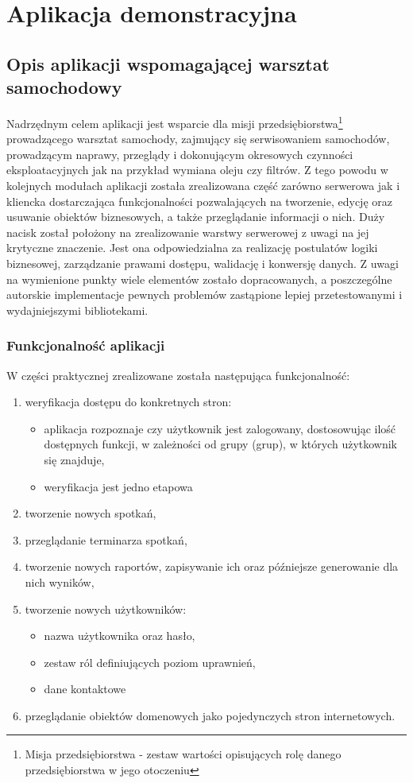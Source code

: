 \chapter{Aplikacja demonstracyjna}
\label{chapter:app}

\section{Opis aplikacji wspomagającej warsztat samochodowy}
	
	Nadrzędnym celem aplikacji jest wsparcie dla misji przedsiębiorstwa\footnote{Misja przedsiębiorstwa - zestaw wartości opisujących rolę danego przedsiębiorstwa w jego otoczeniu} prowadzącego warsztat samochody, zajmujący się serwisowaniem samochodów, prowadzącym naprawy, przeglądy i dokonującym okresowych czynności eksploatacyjnych jak na przykład wymiana oleju czy filtrów. Z tego powodu w kolejnych modułach aplikacji została zrealizowana część zarówno serwerowa jak i kliencka dostarczająca funkcjonalności pozwalających na tworzenie, edycję oraz usuwanie obiektów biznesowych, a także przeglądanie informacji o nich. Duży nacisk został położony na zrealizowanie warstwy serwerowej z uwagi na jej krytyczne znaczenie. Jest ona odpowiedzialna za realizację postulatów logiki biznesowej, zarządzanie prawami dostępu, walidację i konwersję danych. Z uwagi na wymienione punkty wiele elementów zostało dopracowanych, a poszczególne autorskie implementacje pewnych problemów zastąpione lepiej przetestowanymi i wydajniejszymi bibliotekami.
		
	\subsection{Funkcjonalność aplikacji}
	W części praktycznej zrealizowane została następująca funkcjonalność:
	\begin{enumerate}
		\item weryfikacja dostępu do konkretnych stron:
		\begin{itemize}
			\item aplikacja rozpoznaje czy użytkownik jest zalogowany, dostosowując ilość dostępnych funkcji,
			w zależności od grupy (grup), w których użytkownik się znajduje,
			\item weryfikacja jest jedno etapowa
		\end{itemize}
		\item tworzenie nowych spotkań,
		\item przeglądanie terminarza spotkań,
		\item tworzenie nowych raportów, zapisywanie ich oraz późniejsze generowanie dla nich wyników,
		\item tworzenie nowych użytkowników:
		\begin{itemize}
			\item nazwa użytkownika oraz hasło,
			\item zestaw ról definiujących poziom uprawnień,
			\item dane kontaktowe
		\end{itemize}
		\item przeglądanie obiektów domenowych jako pojedynczych stron internetowych.
	\end{enumerate}
	
